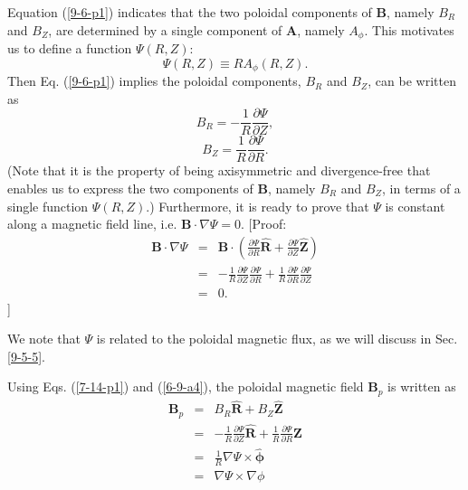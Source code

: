 \documentclass{llncs}
\newcommand{\tmmathbf}[1]{\ensuremath{\boldsymbol{#1}}}
\begin{document}
Equation (\ref{9-6-p1}) indicates that the two poloidal components of
$\mathbf{B}$, namely $B_R$ and $B_Z$, are determined by a single component of
$\mathbf{A}$, namely $A_{\phi}$. This motivates us to define a function $\Psi
(R, Z)$:
\begin{equation}
  \label{2-14-1} \Psi (R, Z) \equiv R A_{\phi} (R, Z) .
\end{equation}
Then Eq. (\ref{9-6-p1}) implies the poloidal components, $B_R$ and $B_Z$, can
be written as
\begin{equation}
  \label{7-14-p1} B_R = - \frac{1}{R} \frac{\partial \Psi}{\partial Z},
\end{equation}
\begin{equation}
  \label{6-9-a4} B_Z = \frac{1}{R} \frac{\partial \Psi}{\partial R} .
\end{equation}
(Note that it is the property of being axisymmetric and divergence-free that
enables us to express the two components of $\mathbf{B}$, namely $B_R$ and
$B_Z$, in terms of a single function $\Psi (R, Z)$.) Furthermore, it is ready
to prove that $\Psi$ is constant along a magnetic field line, i.e. $\mathbf{B}
\cdot \nabla \Psi = 0$. [Proof:
\begin{eqnarray}
  \mathbf{B} \cdot \nabla \Psi & = & \mathbf{B} \cdot \left( \frac{\partial
  \Psi}{\partial R} \hat{\mathbf{R}} + \frac{\partial \Psi}{\partial Z}
  \hat{\mathbf{Z}} \right) \nonumber\\
  & = & - \frac{1}{R} \frac{\partial \Psi}{\partial Z} \frac{\partial
  \Psi}{\partial R} + \frac{1}{R} \frac{\partial \Psi}{\partial R}
  \frac{\partial \Psi}{\partial Z} \nonumber\\
  & = & 0. 
\end{eqnarray}
]

We note that $\Psi$ is related to the poloidal magnetic flux, as we will
discuss in Sec. \ref{9-5-5}.

Using Eqs. (\ref{7-14-p1}) and (\ref{6-9-a4}), the poloidal magnetic field
$\mathbf{B}_p$ is written as
\begin{eqnarray}
  \mathbf{B}_p & = & B_R \hat{\mathbf{R}} + B_Z \hat{\mathbf{Z}} \nonumber\\
  & = & - \frac{1}{R} \frac{\partial \Psi}{\partial Z} \hat{\mathbf{R}} +
  \frac{1}{R} \frac{\partial \Psi}{\partial R} \hat{\mathbf{Z}} \nonumber\\
  & = & \frac{1}{R} \nabla \Psi \times \hat{\tmmathbf{\phi}} \nonumber\\
  & = & \nabla \Psi \times \nabla \phi  \label{20-5-9-p10}
\end{eqnarray}
\end{document}
